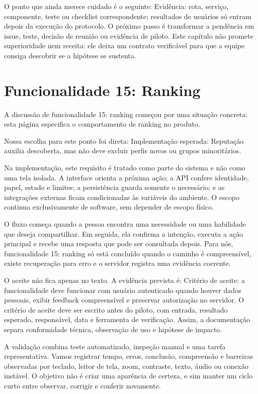 \documentclass[12pt,oneside,a4paper,article]{abntex2}
\begin{document}
O ponto que ainda merece cuidado é o seguinte: Evidência: rota, serviço, componente, teste ou checklist correspondente; resultados de usuários só entram depois da execução do protocolo. O próximo passo é transformar a pendência em issue, teste, decisão de reunião ou evidência de piloto. Este capítulo não promete superioridade nem receita: ele deixa um contrato verificável para que a equipe consiga descobrir se a hipótese se sustenta.

\section{Funcionalidade 15: Ranking}
A discussão de funcionalidade 15: ranking começou por uma situação concreta: esta página especifica o comportamento de ranking no produto.

Nossa escolha para este ponto foi direta: Implementação esperada: Reputação auxilia descoberta, mas não deve excluir perfis novos ou grupos minoritários.

Na implementação, este requisito é tratado como parte do sistema e não como uma tela isolada. A interface orienta a próxima ação; a API confere identidade, papel, estado e limites; a persistência guarda somente o necessário; e as integrações externas ficam condicionadas às variáveis do ambiente. O escopo continua exclusivamente de software, sem depender de escopo físico.

O fluxo começa quando a pessoa encontra uma necessidade ou uma habilidade que deseja compartilhar. Em seguida, ela confirma a intenção, executa a ação principal e recebe uma resposta que pode ser consultada depois. Para nós, funcionalidade 15: ranking só está concluído quando o caminho é compreensível, existe recuperação para erro e o servidor registra uma evidência coerente.

O aceite não fica apenas no texto. A evidência prevista é: Critério de aceite: a funcionalidade deve funcionar com usuário autenticado quando houver dados pessoais, exibir feedback compreensível e preservar autorização no servidor. O critério de aceite deve ser escrito antes do piloto, com entrada, resultado esperado, responsável, data e ferramenta de verificação. Assim, a documentação separa conformidade técnica, observação de uso e hipótese de impacto.

A validação combina teste automatizado, inspeção manual e uma tarefa representativa. Vamos registrar tempo, erros, conclusão, compreensão e barreiras observadas por teclado, leitor de tela, zoom, contraste, texto, áudio ou conexão instável. O objetivo não é criar uma aparência de certeza, e sim manter um ciclo curto entre observar, corrigir e conferir novamente.
\end{document}
